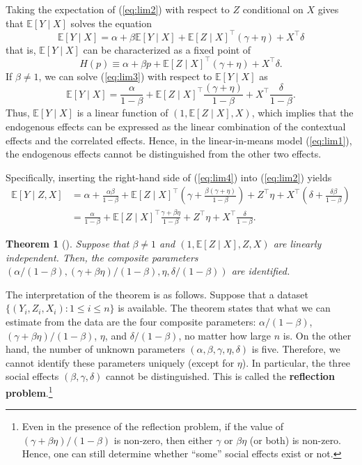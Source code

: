 \documentclass[10.5pt, A4paper, openany, uplatex]{book}
\newcommand{\E}{\mathbb{E}}
\newtheorem{theorem}{Theorem}[section]
\numberwithin{equation}{section}
\begin{document}
Taking the expectation of (\ref{eq:lim2}) with respect to $Z$ conditional on $X$ gives that $\E[Y \mid X]$ solves the  equation
\begin{equation}\label{eq:lim3}
	\E[Y \mid X] = \alpha + \beta \E[Y \mid X] + \E[Z \mid X]^\top (\gamma + \eta) + X^\top \delta 
\end{equation}
that is, $\E[Y \mid X]$ can be characterized as a fixed point of
\[
	H(p) \equiv \alpha + \beta p + \E[Z \mid X]^\top (\gamma + \eta) + X^\top \delta .
\]
If $\beta \neq 1$, we can solve (\ref{eq:lim3}) with respect to $\E[Y \mid X]$ as
\begin{equation}\label{eq:lim4}
	\E[Y \mid X] = \frac{\alpha}{1 -\beta} + \E[Z \mid X]^\top \frac{ (\gamma + \eta)}{1 - \beta} + X^\top \frac{\delta}{1 - \beta}. 
\end{equation}
Thus, $\E[Y \mid X]$ is a linear function of $(1, \E[Z \mid X], X)$, which implies that the endogenous effects can be expressed as the linear combination of the contextual effects and the correlated effects. Hence, in the linear-in-means model (\ref{eq:lim1}), the endogenous effects cannot be distinguished from the other two effects.

Specifically, inserting the right-hand side of (\ref{eq:lim4}) into (\ref{eq:lim2}) yields
\begin{align*}
	\E[Y \mid Z, X] 
	&= \alpha + \frac{\alpha \beta}{1 -\beta} + \E[Z \mid  X]^\top \left( \gamma +  \frac{\beta (\gamma + \eta)}{1 - \beta}\right) + Z^\top \eta  + X^\top \left( \delta + \frac{\delta \beta}{1 - \beta}\right)\\
	&= \frac{\alpha}{1 -\beta} + \E[Z \mid  X]^\top\frac{\gamma + \beta \eta}{1 - \beta} + Z^\top \eta + X^\top\frac{\delta}{1 - \beta}.
\end{align*}

\begin{theorem}[\cite{manski1993identification}]\label{thm:reflection}
Suppose that $\beta \neq 1$ and $(1, \E[Z \mid X], Z, X)$ are linearly independent.
Then, the composite parameters $(\alpha/(1 -\beta), (\gamma + \beta \eta)/(1 - \beta), \eta, \delta/(1 - \beta))$ are identified.
\end{theorem}

The interpretation of the theorem is as follows.
Suppose that a dataset $\{(Y_i, Z_i, X_i): 1 \le i \le n\}$ is available.
The theorem states that what we can estimate from the data are the four composite parameters: $\alpha/(1 -\beta)$, $(\gamma + \beta \eta)/(1 - \beta)$, $\eta$, and $\delta/(1 - \beta)$, no matter how large $n$ is.
On the other hand, the number of unknown parameters $(\alpha, \beta, \gamma, \eta, \delta)$ is five.
Therefore, we cannot identify these parameters uniquely (except for $\eta$).
In particular, the three social effects $(\beta, \gamma, \delta)$ cannot be distinguished.
This is called the \textbf{reflection problem}.\footnote{
	Even in the presence of the reflection problem, if the value of $(\gamma + \beta \eta)/(1 - \beta)$ is non-zero, then either $\gamma$ or $\beta\eta$ (or both) is non-zero.
	Hence, one can still determine whether ``some'' social effects exist or not.
	}
\end{document}
